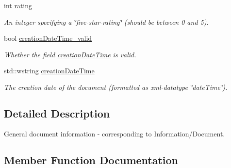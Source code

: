 \begin{DoxyCompactItemize}
\mbox{\label{structlib_c_z_i_1_1_general_document_info_a26ded0bae7ffb1bc68fef7f1862c0508}} 
int \hyperlink{structlib_c_z_i_1_1_general_document_info_a26ded0bae7ffb1bc68fef7f1862c0508}{rating}
\begin{DoxyCompactList}\small\item\em An integer specifying a \char`\"{}five-\/star-\/rating\char`\"{} (should be between 0 and 5). \end{DoxyCompactList}\item 
\mbox{\label{structlib_c_z_i_1_1_general_document_info_a92cc2d839618b931424632b88b51faec}} 
bool \hyperlink{structlib_c_z_i_1_1_general_document_info_a92cc2d839618b931424632b88b51faec}{creation\+Date\+Time\+\_\+valid}
\begin{DoxyCompactList}\small\item\em Whether the field \hyperlink{structlib_c_z_i_1_1_general_document_info_a831ea6520302e16ab56615c3aee316ec}{creation\+Date\+Time} is valid. \end{DoxyCompactList}\item 
\mbox{\label{structlib_c_z_i_1_1_general_document_info_a831ea6520302e16ab56615c3aee316ec}} 
std\+::wstring \hyperlink{structlib_c_z_i_1_1_general_document_info_a831ea6520302e16ab56615c3aee316ec}{creation\+Date\+Time}
\begin{DoxyCompactList}\small\item\em The creation date of the document (formatted as xml-\/datatype \char`\"{}date\+Time\char`\"{}). \end{DoxyCompactList}\end{DoxyCompactItemize}


\subsection{Detailed Description}
General document information -\/ corresponding to Information/\+Document. 

\subsection{Member Function Documentation}
\mbox{\label{structlib_c_z_i_1_1_general_document_info_ac49ad90e783ea088df441c02d07bfcbf}} 
